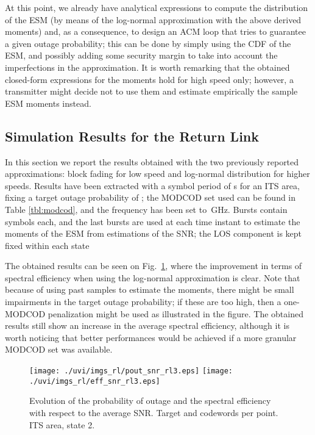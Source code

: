 \documentclass[journal,onecolumn,10pt,a4paper]{IEEEtran}
\begin{document}
At this point, we already have analytical expressions to compute the distribution of the ESM (by means of the log-normal approximation with the above derived moments) and, as a consequence, to design an ACM loop that tries to guarantee a given outage probability; this can be done by simply using the CDF of the ESM, and possibly adding some security margin to take into account the imperfections in the approximation. It is worth remarking that the obtained closed-form expressions for the moments hold for high speed only; however, a transmitter might decide not to use them and estimate empirically the sample ESM moments instead.
 
\subsection{Simulation Results for the Return Link}
In this section we report the results obtained with the two previously reported approximations: block fading for low speed and log-normal distribution for higher speeds. Results have been extracted with a symbol period of s for an ITS area, fixing a target outage probability of ; the MODCOD set used can be found in Table \ref{tbl:modcod}, and the frequency has been set to \,GHz. Bursts contain  symbols each, and the last  bursts are used at each time instant to estimate the moments of the ESM from estimations of the SNR; the LOS component is kept fixed within each state

The obtained results can be seen on Fig.~\ref{fig:pout_snr_rl1}, where the improvement in terms of spectral efficiency when using the log-normal approximation is clear. Note that because of using past samples to estimate the moments, there might be small impairments in the target outage probability; if these are too high, then a one-MODCOD penalization might be used as illustrated in the figure. The obtained results still show an increase in the average spectral efficiency, although it is worth noticing that better performances would be achieved if a more granular MODCOD set was available.

\begin{figure}
\hspace{-.5cm}
 \texttt{[image: ./uvi/imgs\_rl/pout\_snr\_rl3.eps]}\hspace*{-.9cm}
\texttt{[image: ./uvi/imgs\_rl/eff\_snr\_rl3.eps]}
\caption{Evolution of the probability of outage and the spectral efficiency with respect to the average SNR. Target  and  codewords per point. ITS area, state 2.}
 \label{fig:pout_snr_rl1}
\end{figure}
\end{document}
